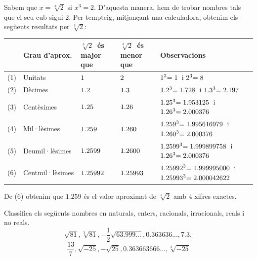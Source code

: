 \begin{solucio}
Sabem que $x=\sqrt[3]{2}$ si $x^{3}=2$. D’aquesta manera, hem de trobar nombres tals que el seu cub sigui $2$. Per tempteig, mitjançant una calculadora,
obtenim els següents resultats per $\sqrt[3]{2}$:

\begin{center}
\begin{tabular}{l|l|l|l|l}
& {\small Grau d’aprox.} & $\sqrt[3]{2}${\small \ és major que} & $\sqrt[3]%
{2}${\small \ és menor que} & {\small Observacions} \\ \hline
{\small (1)} & {\small Unitats} & ${\small 1}$ & ${\small 2}$ & ${\small 1}%
^{3}{\small =1}${\small \ i }${\small 2}^{3}{\small =8}$ \\ 
{\small (2)} & {\small Dècimes} & ${\small 1.2}$ & ${\small 1.3}$ & $%
{\small 1.2}^{3}{\small =1.728}${\small \ i }${\small 1.3}^{3}{\small =2.197}
$ \\ 
{\small (3)} & {\small Centèsimes} & ${\small 1.25}$ & ${\small 1.26}$ & 
${\small 1.25}^{3}{\small =1.953125}${\small \ i }${\small 1.26}^{3}{\small%
=2.000376}$ \\ 
{\small (4)} & {\small Mil·lèsimes} & ${\small 1.259}$ & ${\small 1.260}$
& ${\small 1.259}^{3}{\small =1.995616979}${\small \ i }${\small 1.260}^{3}{\small =2.000376}$ \\ 
{\small (5)} & {\small Deumil·lèsimes} & ${\small 1.2599}$ & ${\small%
1.2600}$ & ${\small 1.2599}^{3}{\small =1.999899758}${\small \ i }${\small%
1.26}^{3}{\small =2.000376}$ \\ 
{\small (6)} & {\small Centmil·lèsimes} & ${\small 1.25992}$ & ${\small 1.25993}$ & ${\small 1.25992}^{3}{\small =1.999995000}${\small \ i }${\small 1.25993}^{3}{\small =2.000042622}$%
\end{tabular}
\end{center}

De (6) obtenim que $1.259$ és el valor aproximat de $\sqrt[3]{2}$ amb 4
xifres exactes.
\end{solucio}

\begin{exercici}
Classifica els següents nombres en naturals, enters, racionals,
irracionals, reals i no reals.%
\begin{equation*}
\sqrt{81},\sqrt[3]{81},-\frac{1}{2}\sqrt{63.999...},0.363636...,7.3,
\end{equation*}%
\begin{equation*}
\frac{13}{7},\sqrt{-25},-\sqrt{25},0.363663666...,\sqrt[3]{-25}
\end{equation*}

\end{exercici}

